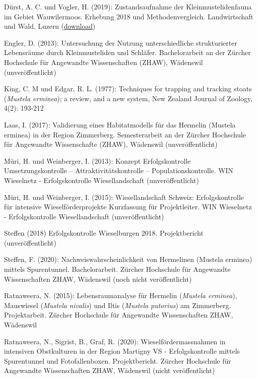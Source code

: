 \documentclass[
  oneside]{scrbook}
\begin{document}
Dürst, A. C. und Vogler, H. (2019): Zustandsaufnahme der Kleinmustelidenfauna im Gebiet Wauwilermoos. Erhebung 2018 und Methodenvergleich. Landwirtschaft und Wald, Luzern (\href{https://lawa.lu.ch/-/media/LAWA/Dokumente/njf/jagd/wildhut/BE_Kleinmusteliden.pdf?la=de-CH\&hash=36F5693ABEA00418BC192264A90DDDC4D95D10A0}{download})

Engler, D. (2013): Untersuchung der Nutzung unterschiedliche strukturierter Lebensräume durch Kleinmusteliden und Schläfer. Bachelorarbeit an der Zürcher Hochschule für Angewandte Wissenschaften (ZHAW), Wädenswil (unveröffentlicht)

King, C. M und Edgar, R. L. (1977): Techniques for trapping and tracking stoats (\emph{Mustela erminea}); a review, and a new system, New Zealand Journal of Zoology, 4(2): 193-212

Laas, I. (2017): Validierung eines Habitatmodells für das Hermelin (Mustela erminea) in der Region Zimmerberg. Semesterarbeit an der Zürcher Hochschule für Angewandte Wissenschafte (ZHAW), Wädenswil (unveröffentlicht)

Müri, H. und Weinberger, I. (2013): Konzept Erfolgskontrolle Umsetzungskontrolle -- Attraktivitätskontrolle -- Populationskontrolle. WIN Wieselnetz - Erfolgskontrolle Wiesellandschaft (unveröffentlicht)

Müri, H. und Weinberger, I. (2015): Wiesellandschaft Schweiz: Erfolgskontrolle für intensive Wieselförderprojekte Kurzfassung für Projektleiter. WIN Wieselnetz - Erfolgskontrolle Wiesellandschaft (unveröffentlicht)

Steffen (2018) Erfolgskontrolle Wieselburgen 2018. Projektbericht (unveröffentlicht)

Steffen, F. (2020): Nachweiswahrscheinlichkeit von Hermelinen (Mustela erminea) mittels Spurentunnel. Bachelorarbeit. Zürcher Hochschule für Angewandte Wissenschaften ZHAW, Wädenswil (noch nicht veröffentlicht)

Ratnaweera, N. (2015): Lebensraumanalyse für Hermelin (\emph{Mustela erminea}), Mauswiesel (\emph{Mustela nivalis}) und Iltis (\emph{Mustela putorius}) am Zimmerberg. Projektarbeit. Zürcher Hochschule für Angewandte Wissenschaften ZHAW, Wädenswil

Ratnaweera, N., Sigrist, B., Graf, R. (2020): Wieselfördermassnahmen in intensiven Obstkulturen in der Region Martigny VS - Erfolgskontrolle mittels Spurentunnel und Fotofallenboxen. Projektbericht. Zürcher Hochschule für Angewandte Wissenschaften ZHAW, Wädenswil (nicht veröffentlicht)
\end{document}
